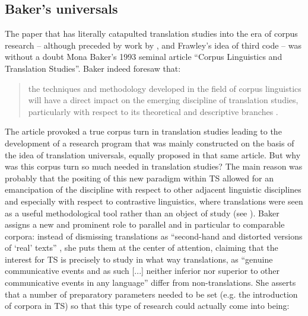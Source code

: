 \subsection{Baker’s universals}
\label{sec:2.2.2}  
\hypertarget{Bakersuniversals}{}
The paper that has literally catapulted translation studies into the era of corpus research – although preceded by work by \citet{toury_search_1980}, \citet{wollin_translationese_1986} and Frawley’s idea of third code \citep{frawley_translation:_1984} – was without a doubt Mona Baker’s 1993 seminal article “Corpus Linguistics and Translation Studies”. Baker indeed foresaw that:

\begin{quote}
the techniques and methodology developed in the field of corpus linguistics will have a direct impact on the emerging discipline of translation studies, particularly with respect to its theoretical and descriptive branches \citep[233]{baker_corpus_1993}.
\end{quote}

The article provoked a true corpus turn in translation studies leading to the development of a research program that was mainly constructed on the basis of the idea of translation universals, equally proposed in that same article. But why was this corpus turn so much needed in translation studies? The main reason was probably that the positing of this new paradigm within TS allowed for an emancipation of the discipline with respect to other adjacent linguistic disciplines and especially with respect to contrastive linguistics, where translations were seen as a useful methodological tool rather than an object of study (see ). Baker assigns a new and prominent role to parallel and in particular to comparable corpora: instead of dismissing translations as “second-hand and distorted versions of ‘real’ texts” \citep[233]{baker_corpus_1993}, she puts them at the center of attention, claiming that the interest for TS is precisely to study in what way translations, as “genuine communicative events and as such [...] neither inferior nor superior to other communicative events in any language” \citep[234]{baker_corpus_1993} differ from non-translations. She asserts that a number of preparatory parameters needed to be set (e.g. the introduction of corpora in TS) so that this type of research could actually come into being:

